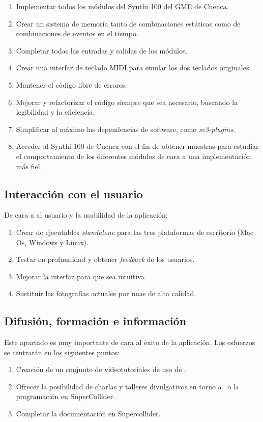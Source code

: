 \begin{enumerate}
	\item Implementar todos los módulos del Synthi 100 del GME de Cuenca.
	\item Crear un sistema de memoria tanto de combinaciones estáticas como de combinaciones de eventos en el tiempo.
	\item Completar todas las entradas y salidas de los módulos.
	\item Crear una interfaz de teclado MIDI para emular los dos teclados originales.
	\item Mantener el código libre de errores.
	\item Mejorar y refactorizar el código siempre que sea necesario, buscando la legibilidad y la eficiencia.
	\item Simplificar al máximo las dependencias de software, como \textit{sc3-plugins}.
	\item Acceder al Synthi 100 de Cuenca con el fin de obtener muestras para estudiar el comportamiento de los diferentes módulos de cara a una implementación más fiel.
\end{enumerate}


\subsection{Interacción con el usuario}
De cara a al usuario y la usabilidad de la aplicación:

\begin{enumerate}
	\item Crear de ejecutables \textit{standalone} para las tres plataformas de escritorio (Mac Os, Windows y Linux).
	\item Testar en profundidad y obtener \textit{feedback} de los usuarios.
	\item Mejorar la interfaz para que sea intuitiva.
	\item Sustituir las fotografías actuales por unas de alta calidad.	
\end{enumerate}


\subsection{Difusión, formación e información}

Este apartado es muy importante de cara al éxito de la aplicación. Los esfuerzos se centrarán en los siguientes puntos:

\begin{enumerate}
	\item Creación de un conjunto de videotutoriales de uso de \appName.
	\item Ofrecer la posibilidad de charlas y talleres divulgativos en torno a \appName~o la programación en SuperCollider.
	\item Completar la documentación en Supercollider.
\end{enumerate}

